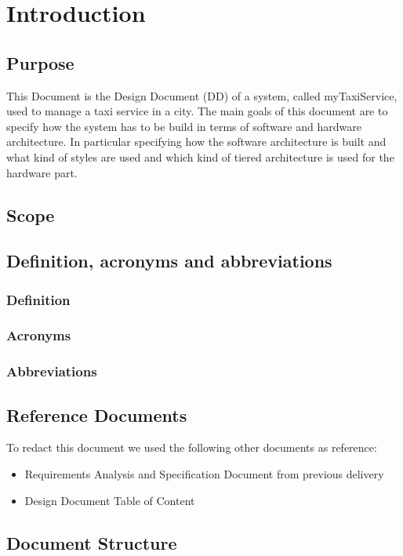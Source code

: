 \section{Introduction}
\subsection{Purpose}
	This Document is the Design Document (DD) of a system, called myTaxiService, used to manage  a taxi service in a city. The main goals of this document are to specify how the system has to be build in terms of software and hardware architecture. In particular specifying how the software architecture is built and what kind of styles are used and which kind of tiered architecture is used for the hardware part.
\subsection{Scope}
	
\subsection{Definition, acronyms and abbreviations}
	\subsubsection{Definition}
	\subsubsection{Acronyms}
	\subsubsection{Abbreviations}
\subsection{Reference Documents}
	To redact this document we used the following other documents as reference:
	\begin{itemize}
		\item Requirements Analysis and Specification Document from previous delivery
		\item Design Document Table of Content 
	\end{itemize}
\subsection{Document Structure}